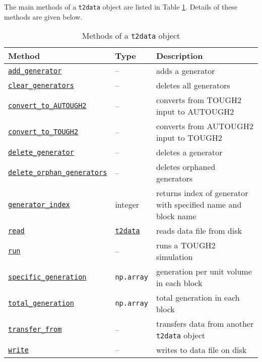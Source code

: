 The main methods of a \texttt{t2data} object are listed in Table \ref{tb:t2data_methods}.  Details of these methods are given below.

\begin{table}
  \begin{center}
    \begin{tabular}{|l|l|p{65mm}|}
      \hline
      \textbf{Method} & \textbf{Type} & \textbf{Description}\\
      \hline
      \hyperref[sec:t2data:add_generator]{\texttt{add\_generator}} & -- & adds a generator\\
      \hyperref[sec:t2data:clear_generators]{\texttt{clear\_generators}} & -- & deletes all generators\\
      \hyperref[sec:t2data:convert_to_AUTOUGH2]{\texttt{convert\_to\_AUTOUGH2}} & -- & converts from TOUGH2 input to AUTOUGH2\\
      \hyperref[sec:t2data:convert_to_TOUGH2]{\texttt{convert\_to\_TOUGH2}} & -- & converts from AUTOUGH2 input to TOUGH2\\
      \hyperref[sec:t2data:delete_generator]{\texttt{delete\_generator}} & -- & deletes a generator\\
      \hyperref[sec:t2data:delete_orphan_generators]{\texttt{delete\_orphan\_generators}} & -- & deletes orphaned generators\\
      \hyperref[sec:t2data:generator_index]{\texttt{generator\_index}} & integer & returns index of generator with specified name and block name\\
      \hyperref[sec:t2data:read]{\texttt{read}} & \hyperref[datafiles]{\texttt{t2data}} & reads data file from disk\\
      \hyperref[sec:t2data:run]{\texttt{run}} & -- & runs a TOUGH2 simulation\\
      \hyperref[sec:t2data:specific_generation]{\texttt{specific\_generation}} & \texttt{np.array} & generation per unit volume in each block\\
      \hyperref[sec:t2data:total_generation]{\texttt{total\_generation}} & \texttt{np.array} & total generation in each block\\
      \hyperref[sec:t2data:transfer_from]{\texttt{transfer\_from}} & -- & transfers data from another \texttt{t2data} object\\
      \hyperref[sec:t2data:write]{\texttt{write}} & -- & writes to data file on disk\\
      \hline
    \end{tabular}
    \caption{Methods of a \texttt{t2data} object}
    \label{tb:t2data_methods}
  \end{center}
\end{table}

